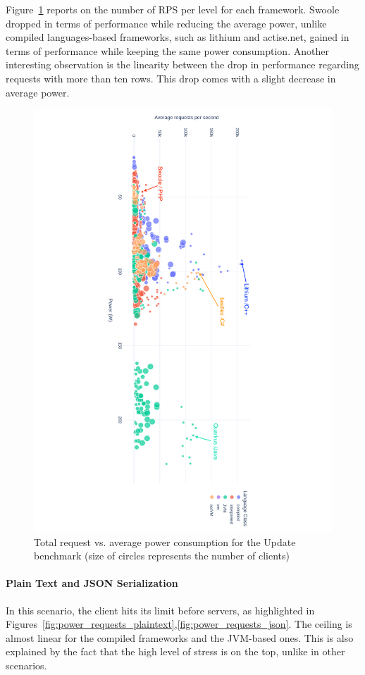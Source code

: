 Figure~\ref{fig:power_requests_update} reports on the number of RPS per level for each framework.
Swoole dropped in terms of performance while reducing the average power, unlike compiled languages-based frameworks, such as lithium and actise.net, gained in terms of performance while keeping the same power consumption.
Another interesting observation is the linearity between the drop in performance regarding requests with more than ten rows.
This drop comes with a slight decrease in average power.

\begin{figure}[hbt]
    \includegraphics[height=\textwidth,width=\textheight,keepaspectratio,angle=90]{imgs/power_requests_update}
    \caption{Total request vs. average power consumption for the Update benchmark (size of circles represents the number of clients)}
    \label{fig:power_requests_update}
\end{figure}

\paragraph{Plain Text and JSON Serialization}
In this scenario, the client hits its limit before servers, as highlighted in Figures~\ref{fig:power_requests_plaintext},\ref{fig:power_requests_json}.
The ceiling is almost linear for the compiled frameworks and the JVM-based ones.
This is also explained by the fact that the high level of stress is on the top, unlike in other scenarios.


